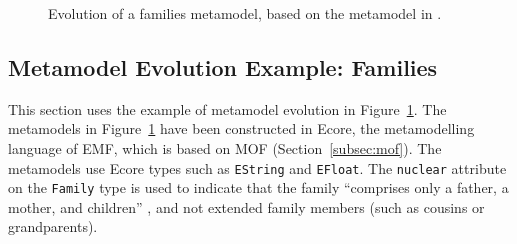 \begin{figure}[htbp]
	\centering
	\caption[Evolution of a families metamodel]{Evolution of a families metamodel, based on the metamodel in \cite{hutn}.}
\label{fig:families_mms}
\end{figure}

\subsection{Metamodel Evolution Example: Families}
\label{subsec:families_example}
This section uses the example of metamodel evolution in Figure~\ref{fig:families_mms}. The metamodels in Figure~\ref{fig:families_mms} have been constructed in Ecore, the metamodelling language of EMF, which is based on MOF (Section~\ref{subsec:mof}). The metamodels use Ecore types such as \texttt{ESt\-ri\-ng} and \texttt{EFlo\-at}. The \texttt{nu\-cl\-e\-ar} attribute on the \texttt{Fa\-mi\-ly} type is used to indicate that the family ``comprises only a father, a mother, and children'' \cite{nucleardef}, and not extended family members (such as cousins or grandparents).


